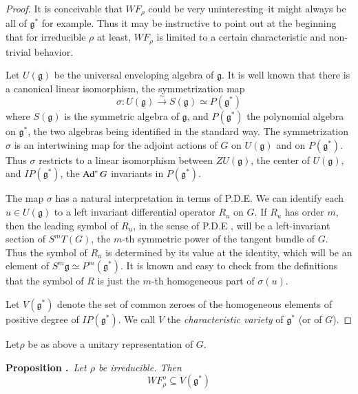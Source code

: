 \begin{proof}
It is conceivable that $WF_{\rho}$ could be very uninteresting--it might always be all of $\mathfrak{g}^{*}$ for example. Thus it may be instructive to point out at the beginning that for irreducible $\rho$ at least, $WF_{\rho}$ is limited to a certain characteristic and non-trivial behavior.

Let $U(\mathfrak{g})$ be the universal enveloping algebra of $\mathfrak{g}$. It is well known that there is a canonical linear isomorphism, the symmetrization map
\begin{equation*}
\sigma : U(\mathfrak{g})\xrightarrow{\sim}S(\mathfrak{g})\simeq P(\mathfrak{g}^{*})\tag{1.9}\label{art3-eq1.9}
\end{equation*}
where $S(\mathfrak{g})$ is the symmetric algebra of $\mathfrak{g}$, and $P(\mathfrak{g}^{*})$ the polynomial algebra on $\mathfrak{g}^{*}$, the two algebras being identified in the standard way. The symmetrization $\sigma$ is an intertwining map for the adjoint actions of $G$ on $U(\mathfrak{g})$ and on $P(\mathfrak{g}^{*})$. Thus $\sigma$ restricts to a linear isomorphism between $ZU(\mathfrak{g})$, the center of $U(\mathfrak{g})$, and $IP(\mathfrak{g}^{*})$, the $\operatorname{Ad}^{*}G$ invariants in $P(\mathfrak{g}^{*})$.

The map $\sigma$ has a natural interpretation in terms of P.D.E. We can identify each $u\in U(\mathfrak{g})$ to a left invariant differential operator $R_{u}$ on $G$. If $R_{u}$ has order $m$, then the leading symbol of $R_{u}$, in the sense of P.D.E \cite{art3-D}, will be a left-invariant section of $S^{m}T(G)$, the $m$-th symmetric power of the tangent bundle of $G$. Thus the symbol of $R_{u}$ is determined by its value at the identity, which will be an element of $S^{m}\mathfrak{g}\simeq P^{m}(\mathfrak{g}^{*})$. It is known and easy to check from the definitions that the symbol of $R$ is just the $m$-th homogeneous part of $\sigma(u)$.

Let $V(\mathfrak{g}^{*})$ denote the set of common zeroes of the homogeneous elements of positive degree of $IP(\mathfrak{g}^{*})$. We call $V$ the {\em characteristic variety} of $\mathfrak{g}^{*}$ (or of $G$).
\end{proof}

Let\pageoriginale $\rho$ be as above a unitary representation of $G$.

\medskip
\noindent
{\bf Proposition .\label{art3-prop1.2}}~{\em Let $\rho$ be irreducible. Then}
\begin{equation*}
WF^{o}_{\rho}\subseteq V(\mathfrak{g}^{*})\tag{1.10}\label{art3-eq1.10}
\end{equation*}

